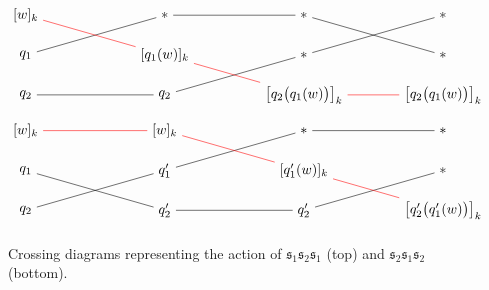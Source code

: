 \documentclass[reqno]{amsart}
\newcommand{\0}{\phantom{c}}
\newcommand{\fraks}{\mathfrak{s}}
\newenvironment{verlong}{}{}
\theoremstyle{plain}
\theoremstyle{definition}
\numberwithin{equation}{section}
\begin{document}
\begin{verlong}
\begin{figure}
\begin{gather*}
\begin{tikzpicture}[xscale=3.5]
\node (i1) at (0,0) {$[w]_k$};
\node (i2) at (0,-1) {$q_1$};
\node (i3) at (0,-2) {$q_2$};
\node (s11) at (1,0) {$\ast$};
\node (s12) at (1,-1) {$[q_1(w)]_k$};
\node (s13) at (1,-2) {$q_2$};
\node (s21) at (2,0) {$\ast$};
\node (s22) at (2,-1) {$\ast$};
\node (s23) at (2,-2) {$\bigl[ q_2\bigl( q_1(w) \bigr) \bigr]_k$};
\node (t1) at (3,0) {$\ast$};
\node (t2) at (3,-1) {$\ast$};
\node (t3) at (3,-2) {$\bigl[ q_2\bigl( q_1(w) \bigr) \bigr]_k$};
\path[-] (i2) edge (s11) (s11) edge (s21) (s21) edge (t2);
\path[-] (i3) edge (s13) (s13) edge (s22) (s22) edge (t1);
\path[-,red] (i1) edge (s12) (s12) edge (s23) (s23) edge (t3);
\end{tikzpicture}
\\
\begin{tikzpicture}[xscale=3.5]
\node (i1) at (0,0) {$[w]_k$};
\node (i2) at (0,-1) {$q_1$};
\node (i3) at (0,-2) {$q_2$};
\node (s11) at (1,0) {$[w]_k$};
\node (s12) at (1,-1) {$q'_1$};
\node (s13) at (1,-2) {$q'_2$};
\node (s21) at (2,0) {$\ast$};
\node (s22) at (2,-1) {$[q'_1(w)]_k$};
\node (s23) at (2,-2) {$q'_2$};
\node (t1) at (3,0) {$\ast$};
\node (t2) at (3,-1) {$\ast$};
\node (t3) at (3,-2) {$\bigl[ q'_2\bigl( q'_1(w) \bigr) \bigr]_k$};
\path[-] (i2) edge (s13) (s13) edge (s23) (s23) edge (t2);
\path[-] (i3) edge (s12) (s12) edge (s21) (s21) edge (t1);
\path[-,red] (i1) edge (s11) (s11) edge (s22) (s22) edge (t3);
\end{tikzpicture}
\end{gather*}
\caption{Crossing diagrams representing the action of $\fraks_1 \fraks_2 \fraks_1$ (top) and $\fraks_2 \fraks_1 \fraks_2$ (bottom).}
\label{fig:crossing_diagrams-old6}
\end{figure}

\end{verlong}




{}
\end{document}
